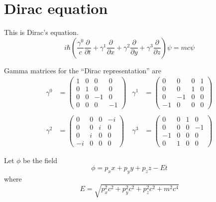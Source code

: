 

\section*{Dirac equation}

This is Dirac's equation.
\begin{equation*}
i\hbar\left(
\frac{\gamma^0}{c}\frac{\partial}{\partial t}+
\gamma^1\frac{\partial}{\partial x}+
\gamma^2\frac{\partial}{\partial y}+
\gamma^3\frac{\partial}{\partial z}
\right)\psi
=mc\psi
\end{equation*}

Gamma matrices for the ``Dirac representation'' are
\begin{align*}
\gamma^0&=\begin{pmatrix}1&0&0&0\\0&1&0&0\\0&0&-1&0\\0&0&0&-1\end{pmatrix}
& \gamma^1&=\begin{pmatrix}0&0&0&1\\0&0&1&0\\0&-1&0&0\\-1&0&0&0\end{pmatrix}
\\
\\
\gamma^2&=\begin{pmatrix}0&0&0&-i\\0&0&i&0\\0&i&0&0\\-i&0&0&0\end{pmatrix}
& \gamma^3&=\begin{pmatrix}0&0&1&0\\0&0&0&-1\\-1&0&0&0\\0&1&0&0\end{pmatrix}
\end{align*}

Let $\phi$ be the field
\begin{equation*}
\phi=p_xx+p_yy+p_zz-Et
\end{equation*}
where
\begin{equation*}
E=\sqrt{p_x^2c^2+p_y^2c^2+p_z^2c^2+m^2c^4}
\end{equation*}

